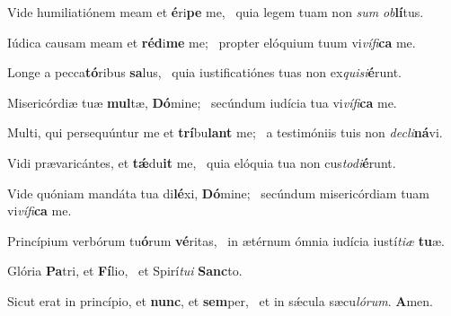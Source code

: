 \item Vide humiliatiónem meam et \textbf{é}ri\textbf{pe} me,~\psstar{} quia legem tuam non \textit{sum} \textit{ob}\textbf{lí}tus.

\item Iúdica causam meam et \textbf{réd}i\textbf{me} me;~\psstar{} propter elóquium tuum vi\textit{vífi}\textbf{ca} me.

\item Longe a pecca\textbf{tó}ribus \textbf{sa}lus,~\psstar{} quia iustificatiónes tuas non ex\textit{quisi}\textbf{é}runt.

\item Misericórdiæ tuæ \textbf{mul}tæ, \textbf{Dó}mine;~\psstar{} secúndum iudícia tua vi\textit{vífi}\textbf{ca} me.

\item Multi, qui persequúntur me et \textbf{trí}bu\textbf{lant} me;~\psstar{} a testimóniis tuis non \textit{decli}\textbf{ná}vi.

\item Vidi prævaricántes, et \textbf{tǽ}du\textbf{it} me,~\psstar{} quia elóquia tua non cus\textit{todi}\textbf{é}runt.

\item Vide quóniam mandáta tua di\textbf{lé}xi, \textbf{Dó}mine;~\psstar{} secúndum misericórdiam tuam vi\textit{vífi}\textbf{ca} me.

\item Princípium verbórum tu\textbf{ó}rum \textbf{vé}ritas,~\psstar{} in ætérnum ómnia iudícia iustí\textit{tiæ} \textbf{tu}æ.

\item Glória \textbf{Pa}tri, et \textbf{Fí}lio,~\psstar{} et Spirí\textit{tui} \textbf{Sanc}to.

\item Sicut erat in princípio, et \textbf{nunc}, et \textbf{sem}per,~\psstar{} et in sǽcula sæcu\textit{lórum}. \textbf{A}men.